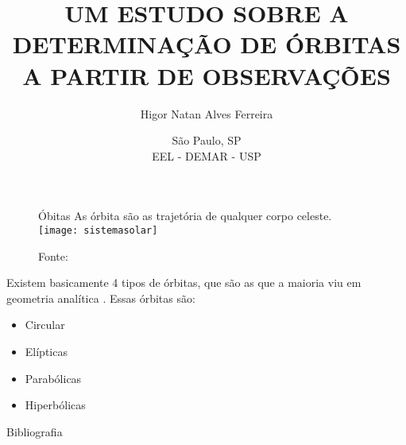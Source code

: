 \documentclass{beamer}
\author[Higor Natan ]{Higor Natan Alves Ferreira \\
	\text{\scriptsize{higornatatanusp2019.com@usp.br}}}
\title[Estudo sobre Óbitas]{ UM ESTUDO SOBRE A DETERMINAÇÃO DE ÓRBITAS A PARTIR DE OBSERVAÇÕES}
\date{\scriptsize{São Paulo, SP} \\  EEL - DEMAR - USP}
\begin{document}
	\begin{frame}
		\titlepage
	\end{frame}

\begin{frame}
\begin{figure}
	\begin{block}{ Óbitas }
	As órbita são as trajetória de qualquer corpo celeste.
	\centering
	\texttt{[image: sistemasolar]} \\
	\caption{Fonte:\cite{ferrer2017}}
	\end{block}
\end{figure}

\end{frame}

\begin{frame}

	\begin{tcolorbox}[colback=black!5!white,colframe=black!70!white,title=Tipos de Órbitas]
Existem basicamente 4 tipos de órbitas, que são as que a maioria viu em geometria analítica \cite{greene2019}. Essas órbitas são:
\begin{itemize}
	\item<1-> Circular
	\item <2-> Elípticas
	\item<3-> Parabólicas
	\item<4-> Hiperbólicas
\end{itemize}
	\end{tcolorbox}


\end{frame}



\begin{frame}{Bibliografia}

\end{frame}
\end{document}
